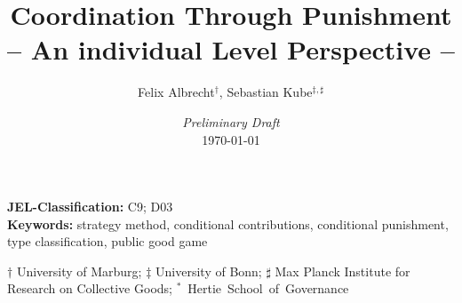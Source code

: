 \documentclass[11pt,a4paper]{article}
\author{Felix Albrecht$^{\dag}$, Sebastian Kube$^{\ddag, \sharp}$}
\title{Coordination Through Punishment \\-- An individual Level Perspective --}
\date{\emph{Preliminary Draft}\\ \today}
\begin{document}
\maketitle
\thispagestyle{empty}
\begin{abstract}
\end{abstract}\bigskip

\noindent \textbf{JEL-Classification:} C9; D03\\
\textbf{Keywords:} strategy method, conditional contributions, conditional punishment, type classification, public good game
\bigskip

\begin{center}
    {\small$\dag$ University of Marburg; $\ddag$ University of Bonn; $\sharp$ Max Planck Institute for Research on Collective Goods; \mbox{$^*$ Hertie School of Governance}}
\end{center}

\newpage

\end{document}
